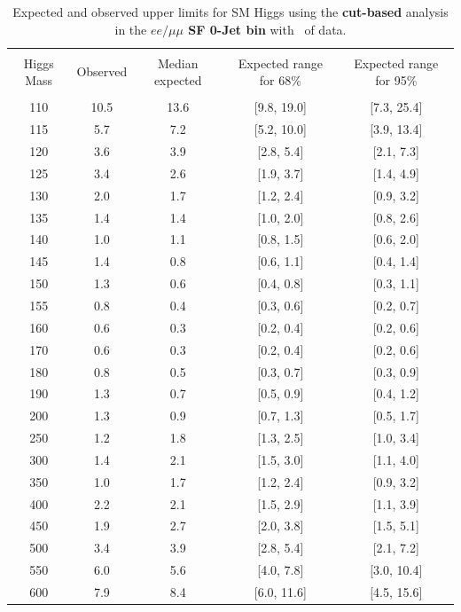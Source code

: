 \begin{table}[hbp!]
\begin{center}
\begin{tabular}{c c c c c}
\hline
\vspace{-3mm} && \\
 Higgs Mass & Observed  & Median expected & Expected range for 68\% & Expected range for 95\%   \\
\vspace{-3mm} && \\
\hline
110 & 10.5 & 13.6 & [9.8, 19.0] & [7.3, 25.4] \\
115 & 5.7 & 7.2 & [5.2, 10.0] & [3.9, 13.4] \\
120 & 3.6 & 3.9 & [2.8, 5.4] & [2.1, 7.3] \\
125 & 3.4 & 2.6 & [1.9, 3.7] & [1.4, 4.9] \\
130 & 2.0 & 1.7 & [1.2, 2.4] & [0.9, 3.2] \\
135 & 1.4 & 1.4 & [1.0, 2.0] & [0.8, 2.6] \\
140 & 1.0 & 1.1 & [0.8, 1.5] & [0.6, 2.0] \\
145 & 1.4 & 0.8 & [0.6, 1.1] & [0.4, 1.4] \\
150 & 1.3 & 0.6 & [0.4, 0.8] & [0.3, 1.1] \\
155 & 0.8 & 0.4 & [0.3, 0.6] & [0.2, 0.7] \\
160 & 0.6 & 0.3 & [0.2, 0.4] & [0.2, 0.6] \\
170 & 0.6 & 0.3 & [0.2, 0.4] & [0.2, 0.6] \\
180 & 0.8 & 0.5 & [0.3, 0.7] & [0.3, 0.9] \\
190 & 1.3 & 0.7 & [0.5, 0.9] & [0.4, 1.2] \\
200 & 1.3 & 0.9 & [0.7, 1.3] & [0.5, 1.7] \\
250 & 1.2 & 1.8 & [1.3, 2.5] & [1.0, 3.4] \\
300 & 1.4 & 2.1 & [1.5, 3.0] & [1.1, 4.0] \\
350 & 1.0 & 1.7 & [1.2, 2.4] & [0.9, 3.2] \\
400 & 2.2 & 2.1 & [1.5, 2.9] & [1.1, 3.9] \\
450 & 1.9 & 2.7 & [2.0, 3.8] & [1.5, 5.1] \\
500 & 3.4 & 3.9 & [2.8, 5.4] & [2.1, 7.2] \\
550 & 6.0 & 5.6 & [4.0, 7.8] & [3.0, 10.4] \\
600 & 7.9 & 8.4 & [6.0, 11.6] & [4.5, 15.6] \\
\hline
\end{tabular}
\caption{Expected and observed upper limits for SM Higgs using the
  {\bf cut-based} analysis in the {\bf $ee/\mu\mu$ SF 0-Jet bin} with \intlumiEightTeV\ of data.}
\label{tab:cutbase_uls_0jsf}
\end{center}
\end{table}
